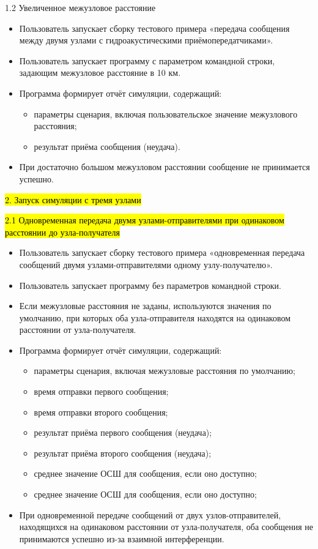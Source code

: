 1.2 Увеличенное межузловое расстояние

\begin{itemize}
\item
  Пользователь запускает сборку тестового примера «передача сообщения
  между двумя узлами с гидроакустическими приёмопередатчиками».
\item
  Пользователь запускает программу с параметром командной строки,
  задающим межузловое расстояние в 10 км.
\item
  Программа формирует отчёт симуляции, содержащий:

  \begin{itemize}
  \item
    параметры сценария, включая пользовательское значение межузлового
    расстояния;
  \item
    результат приёма сообщения (неудача).
  \end{itemize}
\item
  При достаточно большом межузловом расстоянии сообщение не принимается
  успешно.
\end{itemize}

\hl{2. Запуск симуляции с тремя узлами}

\hl{2.1 Одновременная передача двумя узлами-отправителями при одинаковом
расстоянии до узла-получателя}

\begin{itemize}
\item
  Пользователь запускает сборку тестового примера «одновременная
  передача сообщений двумя узлами-отправителями одному узлу-получателю».
\item
  Пользователь запускает программу без параметров командной строки.
\item
  Если межузловые расстояния не заданы, используются значения по
  умолчанию, при которых оба узла-отправителя находятся на одинаковом
  расстоянии от узла-получателя.
\item
  Программа формирует отчёт симуляции, содержащий:

  \begin{itemize}
  \item
    параметры сценария, включая межузловые расстояния по умолчанию;
  \item
    время отправки первого сообщения;
  \item
    время отправки второго сообщения;
  \item
    результат приёма первого сообщения (неудача);
  \item
    результат приёма второго сообщения (неудача);
  \item
    среднее значение ОСШ для сообщения, если оно доступно;
  \item
    среднее значение ОСШ для сообщения, если оно доступно;
  \end{itemize}
\item
  При одновременной передаче сообщений от двух узлов-отправителей,
  находящихся на одинаковом расстоянии от узла-получателя, оба сообщения
  не принимаются успешно из-за взаимной интерференции.
\end{itemize}

